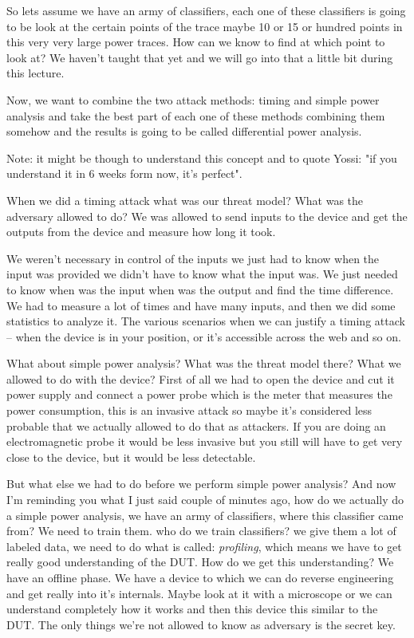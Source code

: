  So lets assume we have an army of classifiers, each one of these classifiers is going to be look at the certain points of the trace maybe 10 or 15 or hundred points in this very very large power traces. How can we know to find at which point to look at? We haven't taught that yet and we will go into that a little bit during this lecture. 
 
 Now, we want to combine the two attack methods: timing and simple power analysis and take the best part of each one of these methods combining them somehow and the results is going to be called differential power analysis.
 
 Note: it might be though to understand this concept and to quote Yossi: "if you understand it in 6 weeks form now, it's perfect".
 
 When we did a timing attack what was our threat model?
 What was the adversary allowed to do?
 We was allowed to send inputs to the device and get the outputs from the device and measure how long it took.
 
 We weren’t necessary in control of the inputs we just had to know when the input was provided we didn’t have to know what the input was. We just needed to know when was the input when was the output and find the time difference. We had to measure a lot of times and have many inputs, and then we did some statistics to analyze it.
  The various scenarios when we can justify a timing attack – when the device is in your position, or it's accessible across the web and so on.
  
  What about simple power analysis? What was the threat model there? What we allowed to do with the device?
  First of all we had to open the device and cut it power supply and connect a power probe which is the meter that measures the power consumption, this is an invasive attack so maybe it’s considered less probable that we actually allowed to do that as attackers. If you are doing an electromagnetic probe it would be less invasive but you still will have to get very close to the device, but it would be less detectable. 
  
  But what else we had to do before we perform simple power analysis? And now I’m reminding you what I just said couple of minutes ago, how do we actually do a simple power analysis, we have an army of classifiers, where this classifier came from? We need to train them. who do we train classifiers? we give them a lot of labeled data, we need to do what is called: \textit{profiling}, which means we have to get really good understanding of the DUT.
  How do we get this understanding? We have an offline phase.
  We have a device to which we can do reverse engineering and get really into it's internals. Maybe look at it with a microscope or we can understand completely how it works and then this device this similar to the DUT. The only things we're not allowed to know as adversary is the secret key.
  

